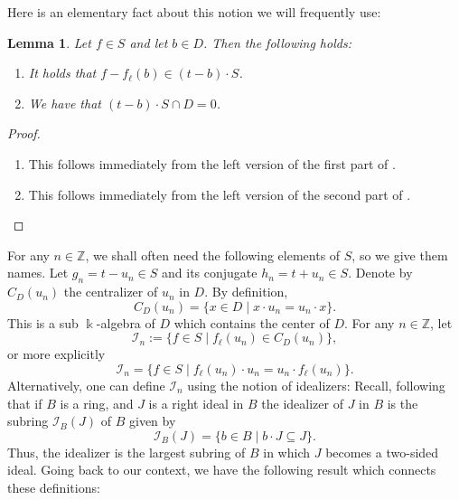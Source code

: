 \documentclass{amsart}
\newtheorem{lem}[equation]{Lemma}
\theoremstyle{definition}
\renewcommand{\k}{\Bbbk}
\numberwithin{equation}{section}
\begin{document}
Here is an elementary fact about this notion we will frequently use:
\begin{lem}\label{lem:belongTo}
Let $f \in S$ and let $b \in D$.
Then the following holds:
\begin{enumerate}
\item It holds that $f-f_{\ell}(b)\in (t-b)\cdot S$.
\item We have that $(t-b)\cdot S \cap D = 0$.
\end{enumerate}    
\end{lem}
\begin{proof}
\quad
\begin{enumerate}
\item This follows immediately from the left version of the first part of \cite[Proposition 16.2]{Lam}.
\item This follows immediately from the left version of the second part of \cite[Proposition 16.2]{Lam}.
\end{enumerate}
\end{proof}

For any $n\in \mathbb{Z}$,
we shall often need the following elements of $S$, 
so we give them names. Let $g_n = t-u_n \in S$ and its conjugate $h_n = t+u_n \in S$.
Denote by $C_D(u_n)$ the centralizer of $u_n$ in $D$.
By definition,
\[
C_D(u_n) = \{x \in D \mid x\cdot u_n = u_n \cdot x\}.
\]
This is a sub $\k$-algebra of $D$ which contains the center of $D$.
For any $n \in \mathbb{Z}$,
let 
\begin{equation}\label{eqn:idealizer}
\mathcal{I}_n := \{f \in S \mid f_{\ell}(u_n) \in C_D(u_n)\},
\end{equation}
or more explicitly
\[
\mathcal{I}_n = \{f \in S \mid f_{\ell}(u_n) \cdot u_n = u_n \cdot f_{\ell}(u_n)\}.
\]
Alternatively, one can define $\mathcal{I}_n$ using the notion of idealizers:
Recall, following \cite[1.1.11 and Section 5.5]{NCBook} that if $B$ is a ring, and $J$ is a right ideal in $B$
the idealizer of $J$ in $B$ is the subring $\mathcal{I}_B(J)$ of $B$ given by
\[
\mathcal{I}_B(J) = \{b \in B \mid b\cdot J \subseteq J\}.
\]
Thus, the idealizer is the largest subring of $B$ in which $J$ becomes a two-sided ideal.
Going back to our context, we have the following result which connects these definitions:
\end{document}
